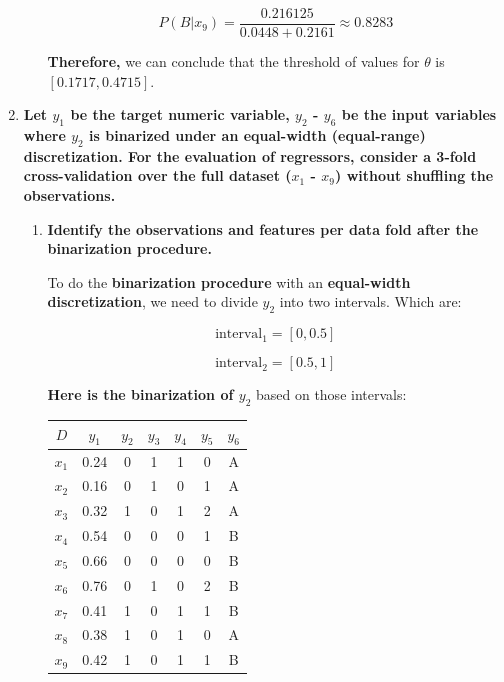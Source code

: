 \documentclass[12pt]{article}
\begin{document}
\begin{enumerate}[leftmargin=\labelsep]
\begin{enumerate}
          \begin{equation*}
            P(B|x_9) = \frac{0.216125}{0.0448+0.2161} \approx 0.8283
          \end{equation*}

          \textbf{Therefore,} we can conclude that the threshold of values for $\theta$ is $[0.1717, 0.4715]$. 
          \end{enumerate}

    \item \textbf{Let $y_1$ be the target numeric variable, $y_2$ - $y_6$ be the input variables where $y_2$ is binarized under an
          equal-width (equal-range) discretization. For the evaluation of regressors, consider a 3-fold
          cross-validation over the full dataset ($x_1$ - $x_9$) without shuffling the observations.}
          \begin{enumerate}
          \item \textbf{Identify the observations and features per data fold after the binarization procedure.}

          \vskip 0.3cm
          To do the \textbf{binarization procedure} with an \textbf{equal-width discretization}, we need to divide $y_2$ into two intervals. Which are:

          \begin{equation*}
              \text{interval}_1 = [0, 0.5]
          \end{equation*}

          \begin{equation*}
              \text{interval}_2 = [0.5, 1]
          \end{equation*}

          \textbf{Here is the binarization of $y_2$} based on those intervals:
          \begin{center}
            \begin{tabular}{c|cccccc}
                \(D\) & \(y_1\) & \(y_2\) & \(y_3\) & \(y_4\) & \(y_5\) & \(y_6\)\\
                \hline
                \(x_1\) & 0.24 & 0 & 1 & 1 & 0 & A  \\
                \(x_2\) & 0.16 & 0 & 1 & 0 & 1 & A  \\
                \(x_3\) & 0.32 & 1 & 0 & 1 & 2 & A  \\
                \(x_4\) & 0.54 & 0 & 0 & 0 & 1 & B  \\
                \(x_5\) & 0.66 & 0 & 0 & 0 & 0 & B  \\
                \(x_6\) & 0.76 & 0 & 1 & 0 & 2 & B  \\
                \(x_7\) & 0.41 & 1 & 0 & 1 & 1 & B  \\
                \(x_8\) & 0.38 & 1 & 0 & 1 & 0 & A  \\
                \(x_9\) & 0.42 & 1 & 0 & 1 & 1 & B  \\
            \end{tabular}
          \end{center}


\end{enumerate}
\end{enumerate}
\end{document}
